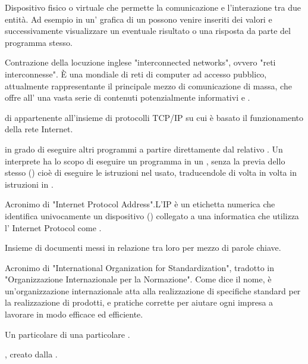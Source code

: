 {Dispositivo fisico o virtuale che permette la comunicazione e l'interazione tra due entità. Ad esempio in un' grafica di un  possono venire inseriti dei valori e successivamente visualizzare un eventuale risultato o una risposta da parte del programma stesso.}

{Contrazione della locuzione inglese "interconnected networks", ovvero "reti interconnesse".
\`{E} una  mondiale di reti di computer ad accesso pubblico, attualmente rappresentante il principale mezzo di comunicazione di massa, che offre all' una vasta serie di contenuti potenzialmente informativi e .}

{ di  appartenente all'insieme di protocolli  TCP/IP su cui è basato il funzionamento della rete Internet.}

{ in grado di eseguire altri programmi a partire direttamente dal relativo . Un interprete ha lo scopo di eseguire un programma in un , senza la previa  dello stesso () cioè di eseguire le istruzioni nel  usato, traducendole di volta in volta in istruzioni in .}

{Acronimo di "Internet Protocol Address".L'IP è un etichetta numerica che identifica univocamente un dispositivo () collegato a una  informatica che utilizza l' Internet Protocol come .}

{Insieme di documenti messi in relazione tra loro per mezzo di parole chiave.} 

{Acronimo di "International Organization for Standardization", tradotto in "Organizzazione Internazionale per la Normazione". Come dice il nome, è un'organizzazione internazionale atta alla realizzazione di specifiche standard per la realizzazione di prodotti,  e pratiche corrette per aiutare ogni impresa a lavorare in modo efficace ed efficiente.}

{Un particolare  di una particolare .}




{ , creato dalla .}

